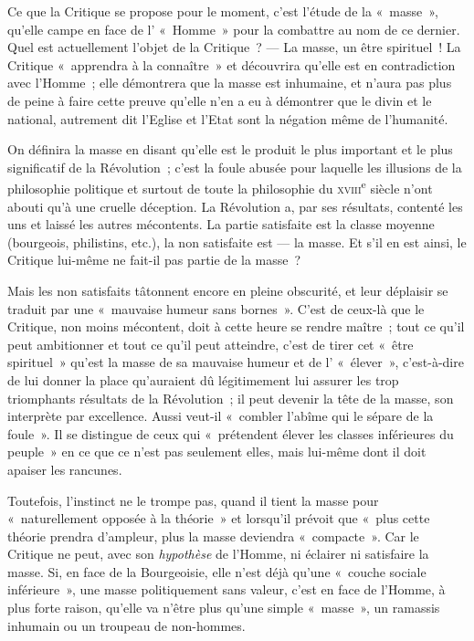 \documentclass[french,twoside]{book} %
\begin{document}
Ce que la Critique se propose pour le moment, c’est l’étude de la « masse », qu’elle campe en face de l’ « Homme » pour la combattre au nom de ce dernier. Quel est actuellement l’objet de la Critique ? — La masse, un être spirituel ! La Critique « apprendra à la connaître » et découvrira qu’elle est en contradiction avec l’Homme ; elle démontrera que la masse est inhumaine, et n’aura pas plus de peine à faire cette preuve qu’elle n’en a eu à démontrer que le divin et le national, autrement dit l’Eglise et l’Etat sont la négation même de l’humanité.\par
On définira la masse en disant qu’elle est le produit le plus important et le plus significatif de la Révolution ; c’est la foule abusée pour laquelle les illusions de la philosophie politique et surtout de toute la philosophie du {\scshape xviii}\textsuperscript{e} siècle n’ont abouti qu’à une cruelle déception. La Révolution a, par ses résultats, contenté les uns et laissé les autres mécontents. La partie satisfaite est la classe moyenne (bourgeois, philistins, etc.), la non satisfaite est — la masse. Et s’il en est ainsi, le Critique lui-même ne fait-il pas partie de la masse ?\par
Mais les non satisfaits tâtonnent encore en pleine obscurité, et leur déplaisir se traduit par une « mauvaise humeur sans bornes ». C’est de ceux-là que le Critique, non moins mécontent, doit à cette heure se rendre maître ; tout ce qu’il peut ambitionner et tout ce qu’il peut atteindre, c’est de tirer cet « être spirituel » qu’est la masse de sa mauvaise humeur et de l’ « élever », c’est-à-dire de lui donner la place qu’auraient dû légitimement lui assurer les trop  triomphants résultats de la Révolution ; il peut devenir la tête de la masse, son interprète par excellence. Aussi veut-il « combler l’abîme qui le sépare de la foule ». Il se distingue de ceux qui « prétendent élever les classes inférieures du peuple » en ce que ce n’est pas seulement elles, mais lui-même dont il doit apaiser les rancunes.\par
Toutefois, l’instinct ne le trompe pas, quand il tient la masse pour « naturellement opposée à la théorie » et lorsqu’il prévoit que « plus cette théorie prendra d’ampleur, plus la masse deviendra « compacte ». Car le Critique ne peut, avec son \emph{hypothèse} de l’Homme, ni éclairer ni satisfaire la masse. Si, en face de la Bourgeoisie, elle n’est déjà qu’une « couche sociale inférieure », une masse politiquement sans valeur, c’est en face de l’Homme, à plus forte raison, qu’elle va n’être plus qu’une simple « masse », un ramassis inhumain ou un troupeau de non-hommes.\par
\end{document}
